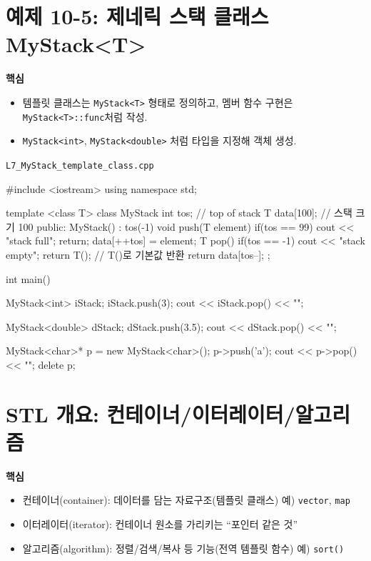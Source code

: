 \documentclass[11pt,a4paper]{article}
\newcommand{\filetag}[1]{\texttt{\color{Accent}#1}}
\begin{document}
\section{예제 10-5: 제네릭 스택 클래스 MyStack<T>}
\begin{GoalBox}
\textbf{핵심}
\begin{itemize}[leftmargin=18pt]
  \item 템플릿 클래스는 \texttt{MyStack<T>} 형태로 정의하고,
        멤버 함수 구현은 \texttt{MyStack<T>::func}처럼 작성.
  \item \texttt{MyStack<int>}, \texttt{MyStack<double>} 처럼 타입을 지정해 객체 생성.
\end{itemize}
\end{GoalBox}

\noindent\filetag{L7\_MyStack\_template\_class.cpp}
\begin{cppcode}
#include <iostream>
using namespace std;

template <class T>
class MyStack {
    int tos;          // top of stack
    T data[100];      // 스택 크기 100
public:
    MyStack() : tos(-1) {}
    void push(T element) {
        if(tos == 99) { cout << "stack full\n"; return; }
        data[++tos] = element;
    }
    T pop() {
        if(tos == -1) { cout << "stack empty\n"; return T(); } // T()로 기본값 반환
        return data[tos--];
    }
};

int main() {
    MyStack<int> iStack;
    iStack.push(3);
    cout << iStack.pop() << "\n";

    MyStack<double> dStack;
    dStack.push(3.5);
    cout << dStack.pop() << "\n";

    MyStack<char>* p = new MyStack<char>();
    p->push('a');
    cout << p->pop() << "\n";
    delete p;
}
\end{cppcode}

\section{STL 개요: 컨테이너/이터레이터/알고리즘}
\begin{GoalBox}
\textbf{핵심}
\begin{itemize}[leftmargin=18pt]
  \item 컨테이너(container): 데이터를 담는 자료구조(템플릿 클래스) 예) \texttt{vector}, \texttt{map}
  \item 이터레이터(iterator): 컨테이너 원소를 가리키는 ``포인터 같은 것''
  \item 알고리즘(algorithm): 정렬/검색/복사 등 기능(전역 템플릿 함수) 예) \texttt{sort()}
\end{itemize}
\end{GoalBox}
\end{document}
